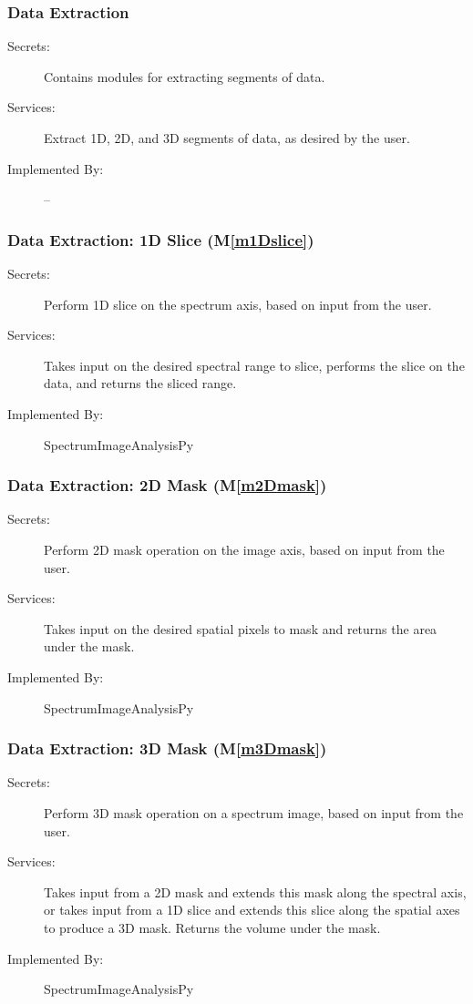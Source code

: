 \documentclass[12pt, titlepage]{article}
\newcommand{\mref}[1]{M\ref{#1}}
\newcommand{\progname}{SpectrumImageAnalysisPy}
\begin{document}
\subsubsection{Data Extraction}
\begin{description}
	\item[Secrets:]Contains modules for extracting segments of data.
	\item[Services:]Extract 1D, 2D, and 3D segments of data, as desired by the user.
	\item[Implemented By:] --
\end{description}

\subsubsection{Data Extraction: 1D Slice (\mref{m1Dslice})}
\begin{description}
	\item[Secrets:]Perform 1D slice on the spectrum axis, based on input from the user.
	\item[Services:]Takes input on the desired spectral range to slice, performs the slice on the data, and returns the sliced range.
	\item[Implemented By:] \progname
\end{description}

\subsubsection{Data Extraction: 2D Mask (\mref{m2Dmask})}
\begin{description}
	\item[Secrets:]Perform 2D mask operation on the image axis, based on input from the user.
	\item[Services:]Takes input on the desired spatial pixels to mask and returns the area under the mask.
	\item[Implemented By:] \progname
\end{description}

\subsubsection{Data Extraction: 3D Mask (\mref{m3Dmask})}
\begin{description}
	\item[Secrets:]Perform 3D mask operation on a spectrum image, based on input from the user.
	\item[Services:]Takes input from a 2D mask and extends this mask along the spectral axis, or takes input from a 1D slice and extends this slice along the spatial axes to produce a 3D mask. Returns the volume under the mask.
	\item[Implemented By:] \progname
\end{description}
\end{document}
